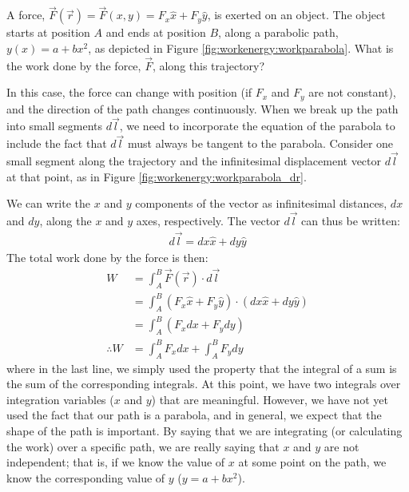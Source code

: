 \begin{example}{
\label{ex:workenergy:workparabola}
A force, $\vec F(\vec r) = \vec F(x,y) = F_x\hat x + F_y \hat y$,  is exerted on an object. The object starts at position $A$ and ends at position $B$, along a parabolic path, $y(x) = a+bx^2$, as depicted in Figure \ref{fig:workenergy:workparabola}. What is the work done by the force, $\vec F$, along this trajectory?}

In this case, the force can change with position (if $F_x$ and $F_y$ are not constant), and the direction of the path changes continuously. When we break up the path into small segments $d\vec l$, we need to incorporate the equation of the parabola to include the fact that $d\vec l$ must always be tangent to the parabola. Consider one small segment along the trajectory and the infinitesimal displacement vector $d\vec l$ at that point, as in Figure \ref{fig:workenergy:workparabola_dr}.

We can write the $x$ and $y$ components of the vector as infinitesimal distances, $dx$ and $dy$, along the $x$ and $y$ axes, respectively. The vector $d\vec l$ can thus be written:
\begin{align*}
d\vec l = dx \hat x + dy \hat y
\end{align*}
The total work done by the force is then:
\begin{align*}
W &= \int_A^B \vec F(\vec r) \cdot d\vec l\\
&=\int_A^B (F_x\hat x + F_y \hat y) \cdot (dx \hat x + dy \hat y)\\
&=\int_A^B (F_x dx + F_ydy)\\
\therefore W&= \int_A^B F_x dx + \int_A^B F_ydy
\end{align*}
where in the last line, we simply used the property that the integral of a sum is the sum of the corresponding integrals. At this point, we have two integrals over integration variables ($x$ and $y$) that are meaningful. However, we have not yet used the fact that our path is a parabola, and in general, we expect that the shape of the path is important. By saying that we are integrating (or calculating the work) over a specific path, we are really saying that $x$ and $y$ are not independent; that is, if we know the value of $x$ at some point on the path, we know the corresponding value of $y$ ($y = a+bx^2$). 


\end{example}
